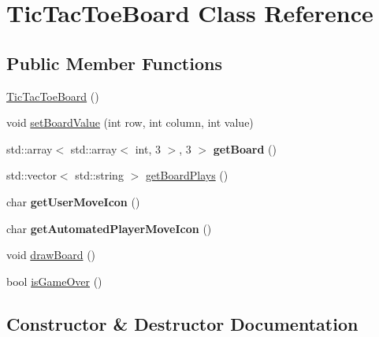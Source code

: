 \hypertarget{class_tic_tac_toe_board}{}\section{Tic\+Tac\+Toe\+Board Class Reference}
\label{class_tic_tac_toe_board}
\subsection*{Public Member Functions}
\begin{DoxyCompactItemize}
\item 
\hyperlink{class_tic_tac_toe_board_adff1ee9118b05338cba02ba1f0352236}{Tic\+Tac\+Toe\+Board} ()
\item 
void \hyperlink{class_tic_tac_toe_board_a9afaf647f860c89bc703c194a754eac5}{set\+Board\+Value} (int row, int column, int value)
\item 
\hypertarget{class_tic_tac_toe_board_a3dbac79162452821fc8182dd15080591}{}std\+::array$<$ std\+::array$<$ int, 3 $>$, 3 $>$ {\bfseries get\+Board} ()\label{class_tic_tac_toe_board_a3dbac79162452821fc8182dd15080591}

\item 
std\+::vector$<$ std\+::string $>$ \hyperlink{class_tic_tac_toe_board_a44b69d2be6ef2273d20f28e0e91af780}{get\+Board\+Plays} ()
\item 
\hypertarget{class_tic_tac_toe_board_a63261fd1737aa98e0682d6a1e6bfb1b5}{}char {\bfseries get\+User\+Move\+Icon} ()\label{class_tic_tac_toe_board_a63261fd1737aa98e0682d6a1e6bfb1b5}

\item 
\hypertarget{class_tic_tac_toe_board_ae8df5ec612ffa13f37413b4aefd16b2c}{}char {\bfseries get\+Automated\+Player\+Move\+Icon} ()\label{class_tic_tac_toe_board_ae8df5ec612ffa13f37413b4aefd16b2c}

\item 
void \hyperlink{class_tic_tac_toe_board_a8ce4bbc6e69d2e2cba3706f51d3f12ee}{draw\+Board} ()
\item 
bool \hyperlink{class_tic_tac_toe_board_a7543dd21d5f1743eced242fbd109fae1}{is\+Game\+Over} ()
\end{DoxyCompactItemize}


\subsection{Constructor \& Destructor Documentation}
\hypertarget{class_tic_tac_toe_board_adff1ee9118b05338cba02ba1f0352236}{}
